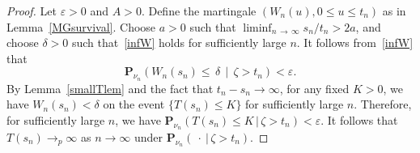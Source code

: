 \documentclass[AHL,Unicode,longabstracts,published]{cedram}
\newcommand*\eps{\varepsilon}
\renewcommand*\P{\mathbf{P}}
\newcommand{\1} {\mathds{1}}
\begin{document}
\begin{proof}
Let $\eps > 0$ and $A > 0$. Define the martingale $(W_n(u), 0 \leq u \leq t_n)$ as in Lemma~\ref{MGsurvival}. Choose $a > 0$ such that $\liminf_{n\,\rightarrow\,\infty} s_n/t_n > 2a$, and choose $\delta > 0$ such that~\eqref{infW} holds for sufficiently large $n$. It follows from~\eqref{infW} that
\begin{equation}\label{Wsn}
\P_{\nu_n} \left(W_n(s_n) \leq \,\delta \,\middle|\, \zeta > t_n\right) < \eps.
\end{equation}
By Lemma~\ref{smallTlem} and the fact that $t_n - s_n \rightarrow \infty$, for any fixed $K > 0$, we have $W_n(s_n) < \delta$ on the event $\{T(s_n) \leq K\}$ for sufficiently large $n$. Therefore, for sufficiently large $n$, we have $\P_{\nu_n}(T(s_n) \leq K\,|\,\zeta > t_n) < \eps$. It follows that $T(s_n) \rightarrow_p \infty$ as $n \rightarrow \infty$ under $\P_{\nu_n}(\: \cdot \:|\,\zeta > t_n)$.


\end{proof}
\end{document}
